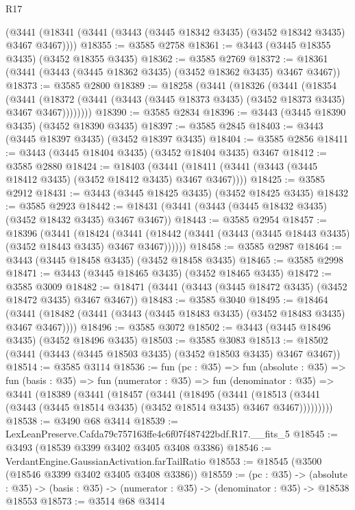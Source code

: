 \begin{lexlean}{R17}
\begin{coremodule}
    (@3441 (@18341 (@3441 (@3443 (@3445 @18342 @3435) (@3452 @18342 @3435) @3467 @3467))))
@18355 := @3585 @2758
@18361 := @3443 (@3445 @18355 @3435) (@3452 @18355 @3435)
@18362 := @3585 @2769
@18372 := @18361 (@3441 (@3443 (@3445 @18362 @3435) (@3452 @18362 @3435) @3467 @3467))
@18373 := @3585 @2800
@18389 := @18258
    (@3441
      (@18326
        (@3441
          (@18354
            (@3441
              (@18372 (@3441 (@3443 (@3445 @18373 @3435) (@3452 @18373 @3435) @3467 @3467))))))))
@18390 := @3585 @2834
@18396 := @3443 (@3445 @18390 @3435) (@3452 @18390 @3435)
@18397 := @3585 @2845
@18403 := @3443 (@3445 @18397 @3435) (@3452 @18397 @3435)
@18404 := @3585 @2856
@18411 := @3443 (@3445 @18404 @3435) (@3452 @18404 @3435) @3467
@18412 := @3585 @2880
@18424 := @18403
    (@3441 (@18411 (@3441 (@3443 (@3445 @18412 @3435) (@3452 @18412 @3435) @3467 @3467))))
@18425 := @3585 @2912
@18431 := @3443 (@3445 @18425 @3435) (@3452 @18425 @3435)
@18432 := @3585 @2923
@18442 := @18431 (@3441 (@3443 (@3445 @18432 @3435) (@3452 @18432 @3435) @3467 @3467))
@18443 := @3585 @2954
@18457 := @18396
    (@3441
      (@18424
        (@3441 (@18442 (@3441 (@3443 (@3445 @18443 @3435) (@3452 @18443 @3435) @3467 @3467))))))
@18458 := @3585 @2987
@18464 := @3443 (@3445 @18458 @3435) (@3452 @18458 @3435)
@18465 := @3585 @2998
@18471 := @3443 (@3445 @18465 @3435) (@3452 @18465 @3435)
@18472 := @3585 @3009
@18482 := @18471 (@3441 (@3443 (@3445 @18472 @3435) (@3452 @18472 @3435) @3467 @3467))
@18483 := @3585 @3040
@18495 := @18464
    (@3441 (@18482 (@3441 (@3443 (@3445 @18483 @3435) (@3452 @18483 @3435) @3467 @3467))))
@18496 := @3585 @3072
@18502 := @3443 (@3445 @18496 @3435) (@3452 @18496 @3435)
@18503 := @3585 @3083
@18513 := @18502 (@3441 (@3443 (@3445 @18503 @3435) (@3452 @18503 @3435) @3467 @3467))
@18514 := @3585 @3114
@18536 := fun (pc : @35) =>
  fun (absolute : @35) =>
  fun (basis : @35) =>
  fun (numerator : @35) =>
  fun (denominator : @35) =>
  @3441
    (@18389
      (@3441
        (@18457
          (@3441
            (@18495
              (@3441
                (@18513 (@3441 (@3443 (@3445 @18514 @3435) (@3452 @18514 @3435) @3467 @3467)))))))))
@18538 := @3490 @68 @3414
@18539 := LexLeanPreserve.Cafda79c757163ffe4c6f07f487422bdf.R17.__fits_5
@18545 := @3493 (@18539 @3399 @3402 @3405 @3408 @3386)
@18546 := VerdantEngine.GaussianActivation.farTailRatio
@18553 := @18545 (@3500 (@18546 @3399 @3402 @3405 @3408 @3386))
@18559 := (pc : @35) ->
  (absolute : @35) -> (basis : @35) -> (numerator : @35) -> (denominator : @35) -> @18538 @18553
@18573 := @3514
    @68
    @3414

\end{coremodule}
\end{lexlean}
